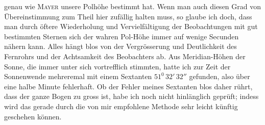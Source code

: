 genau wie \textsc{Mayer} unsere Polhöhe bestimmt hat. Wenn man auch diesen Grad von Übereinstimmung zum Theil hier zufällig halten muss, so glaube ich doch, dass man durch öftere Wiederholung und Vervielfältigung der Beobachtungen mit gut bestimmten Sternen sich der wahren Pol-Höhe immer auf wenige Secunden nähern kann. Alles hängt blos von der Vergrösserung und Deutlichkeit des Fernrohrs und der Achtsamkeit des Beobachters ab. Aus Meridian-Höhen der Sonne, die immer unter sich vortrefflich stimmten, hatte ich zur Zeit der Sonnenwende mehreremal mit einem Sextanten $51^0\,32'\,32''$ gefunden, also über eine halbe Minute fehlerhaft. Ob der Fehler meines Sextanten blos daher rührt, dass der ganze Bogen zu gross ist, habe ich noch nicht hinlänglich geprüft; indess wird das gerade durch die von mir empfohlene Methode sehr leicht künftig geschehen können.

